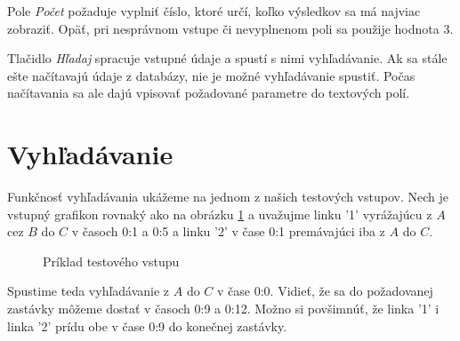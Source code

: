 Pole \textit{Počet} požaduje vyplniť číslo, ktoré určí, koľko výsledkov sa má najviac zobraziť. Opäť, pri nesprávnom vstupe či nevyplnenom poli sa použije hodnota $3$.\newline

Tlačidlo \textit{Hľadaj} spracuje vstupné údaje a spustí s nimi vyhľadávanie. Ak sa stále ešte načítavajú údaje z databázy, nie je možné vyhľadávanie spustiť. Počas načítavania sa ale dajú vpisovať požadované parametre do textových polí.\newline


\section{Vyhľadávanie}

Funkčnosť vyhľadávania ukážeme na jednom z našich testových vstupov. Nech je vstupný grafikon rovnaký ako na obrázku \ref{priklad_vstupu_softver} a uvažujme linku '1' vyrážajúcu z $A$ cez $B$ do $C$ v časoch 0:1 a 0:5 a linku '2' v čase 0:1 premávajúci iba z $A$ do $C$.\newline

\begin{figure}[H]
  \caption{Príklad testového vstupu}
  \label{priklad_vstupu_softver}
\end{figure}

Spustime teda vyhľadávanie z $A$ do $C$ v čase 0:0. Vidieť, že sa do požadovanej zastávky môžeme dostať v časoch 0:9 a 0:12. Možno si povšimnúť, že linka '1' i linka '2' prídu obe v čase 0:9 do konečnej zastávky.\newline

